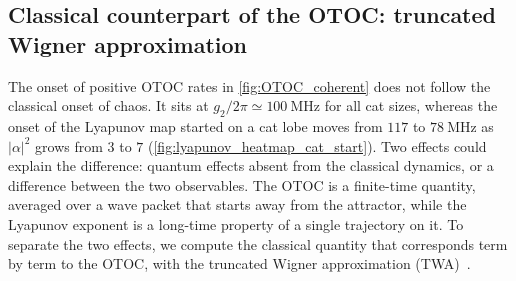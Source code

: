 
\subsection{Classical counterpart of the OTOC: truncated Wigner approximation}
\label{subsec:twa}

The onset of positive OTOC rates in \cref{fig:OTOC_coherent} does not follow the classical onset of chaos. It sits at $g_2/2\pi\simeq100~\mathrm{MHz}$ for all cat sizes, whereas the onset of the Lyapunov map started on a cat lobe moves from $117$ to $78~\mathrm{MHz}$ as $|\alpha|^2$ grows from $3$ to $7$ (\cref{fig:lyapunov_heatmap_cat_start}). Two effects could explain the difference: quantum effects absent from the classical dynamics, or a difference between the two observables. The OTOC is a finite-time quantity, averaged over a wave packet that starts away from the attractor, while the Lyapunov exponent is a long-time property of a single trajectory on it. To separate the two effects, we compute the classical quantity that corresponds term by term to the OTOC, with the truncated Wigner approximation (TWA)~\cite{Steel1998Dec,Sinatra2002Jun,Polkovnikov2010Sep}.

